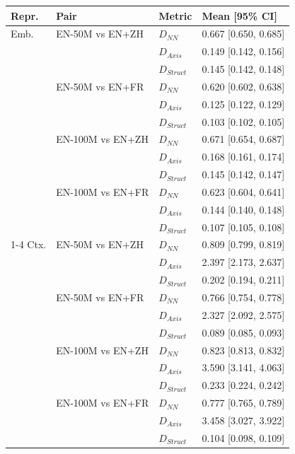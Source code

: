 \begin{tabular}{@{}llll@{}}
\toprule
Repr. & Pair & Metric & Mean [95\% CI] \\
\midrule
Emb. & EN-50M vs EN+ZH & $D_{NN}$ & 0.667 [0.650, 0.685] \\
 &  & $D_{Axis}$ & 0.149 [0.142, 0.156] \\
 &  & $D_{Struct}$ & 0.145 [0.142, 0.148] \\
 & EN-50M vs EN+FR & $D_{NN}$ & 0.620 [0.602, 0.638] \\
 &  & $D_{Axis}$ & 0.125 [0.122, 0.129] \\
 &  & $D_{Struct}$ & 0.103 [0.102, 0.105] \\
 & EN-100M vs EN+ZH & $D_{NN}$ & 0.671 [0.654, 0.687] \\
 &  & $D_{Axis}$ & 0.168 [0.161, 0.174] \\
 &  & $D_{Struct}$ & 0.145 [0.142, 0.147] \\
 & EN-100M vs EN+FR & $D_{NN}$ & 0.623 [0.604, 0.641] \\
 &  & $D_{Axis}$ & 0.144 [0.140, 0.148] \\
 &  & $D_{Struct}$ & 0.107 [0.105, 0.108] \\
\cmidrule(lr){1-4}
Ctx. & EN-50M vs EN+ZH & $D_{NN}$ & 0.809 [0.799, 0.819] \\
 &  & $D_{Axis}$ & 2.397 [2.173, 2.637] \\
 &  & $D_{Struct}$ & 0.202 [0.194, 0.211] \\
 & EN-50M vs EN+FR & $D_{NN}$ & 0.766 [0.754, 0.778] \\
 &  & $D_{Axis}$ & 2.327 [2.092, 2.575] \\
 &  & $D_{Struct}$ & 0.089 [0.085, 0.093] \\
 & EN-100M vs EN+ZH & $D_{NN}$ & 0.823 [0.813, 0.832] \\
 &  & $D_{Axis}$ & 3.590 [3.141, 4.063] \\
 &  & $D_{Struct}$ & 0.233 [0.224, 0.242] \\
 & EN-100M vs EN+FR & $D_{NN}$ & 0.777 [0.765, 0.789] \\
 &  & $D_{Axis}$ & 3.458 [3.027, 3.922] \\
 &  & $D_{Struct}$ & 0.104 [0.098, 0.109] \\
\bottomrule
\end{tabular}
